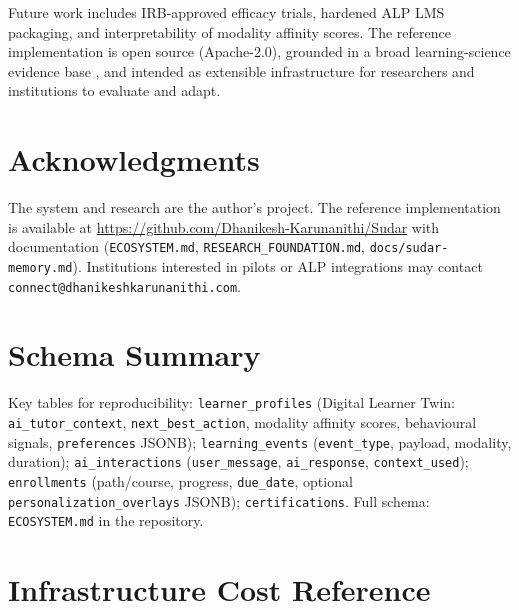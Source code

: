\documentclass[10pt,twocolumn]{article}
\begin{document}
Future work includes IRB-approved efficacy trials, hardened ALP LMS
packaging, and interpretability of modality affinity scores. The
reference implementation is open source (Apache-2.0), grounded in a
broad learning-science evidence base
\cite{vanlehn2011,aleven2016,mayer2009,clark2016,zimmerman2002,%
gagne1985,bull2016,black1998,roediger2006}, and intended as
extensible infrastructure for researchers and institutions to evaluate
and adapt.

\section*{Acknowledgments}

The system and research are the author's project. The reference
implementation is available at
\url{https://github.com/Dhanikesh-Karunanithi/Sudar} with
documentation (\texttt{ECOSYSTEM.md}, \texttt{RESEARCH\_FOUNDATION.md},
\texttt{docs/sudar-memory.md}). Institutions interested in pilots or ALP
integrations may contact \texttt{connect@dhanikeshkarunanithi.com}.

\appendix
\section{Schema Summary}

Key tables for reproducibility:
\texttt{learner\_profiles} (Digital Learner Twin:
\texttt{ai\_tutor\_context}, \texttt{next\_best\_action}, modality
affinity scores, behavioural signals, \texttt{preferences} JSONB);
\texttt{learning\_events} (\texttt{event\_type}, payload, modality,
duration);
\texttt{ai\_interactions} (\texttt{user\_message},
\texttt{ai\_response}, \texttt{context\_used});
\texttt{enrollments} (path/course, progress, \texttt{due\_date},
optional \texttt{personalization\_overlays} JSONB);
\texttt{certifications}.
Full schema: \texttt{ECOSYSTEM.md} in the repository.

\section{Infrastructure Cost Reference}
\label{sec:cost-appendix}
\end{document}
